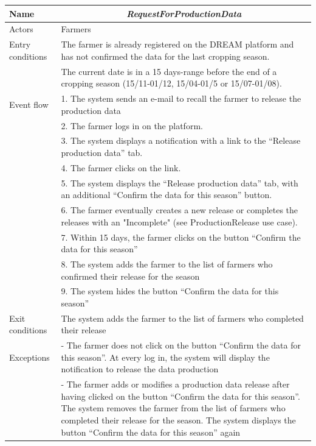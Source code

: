 \begin{table}[H]
	\centering
	\begin{tabularx}{\linewidth}{|l|X|}
		\hline
		Name & \multicolumn{1}{c|}{\textit{\textbf{RequestForProductionData}}}                                                   \tabularnewline \hline
		Actors                                               & Farmers                                                    \tabularnewline \hline
		Entry conditions                                        
		& The farmer is already registered on the DREAM platform and has not confirmed the data for the last cropping season.
		\tabularnewline
		&
		The current date is in a 15 days-range before the end of a cropping season (15/11-01/12, 15/04-01/5 or 15/07-01/08).
		\tabularnewline \hline
		Event flow                                         & 1.	The system sends an e-mail to recall the farmer to release the production data                                           \tabularnewline 
		& 2.	The farmer logs in on the platform.                                             \tabularnewline 
		& 3.	The system displays a notification with a link to the “Release production data” tab.                                           \tabularnewline 
		& 4.	The farmer clicks on the link.                                    \tabularnewline
		& 5.	The system displays the “Release production data” tab, with an additional “Confirm the data for this season” button.                                           \tabularnewline
		& 6.	The farmer eventually creates a new release or completes the releases with an "Incomplete" (see ProductionRelease use case).                                     \tabularnewline
		& 7.	Within 15 days, the farmer clicks on the button “Confirm the data for this season”                                \tabularnewline
		& 8.	The system adds the farmer to the list of farmers who confirmed their release for the season                              \tabularnewline
		& 9.	The system hides the button “Confirm the data for this season”                       \tabularnewline \hline
		Exit conditions 
		& The system adds the farmer to the list of farmers who completed their release 
		\tabularnewline \hline
		Exceptions 
		& 
		-	The farmer does not click on the button “Confirm the data for this season”. At every log in, the system will display the notification to release the data production
		\tabularnewline
		&
		-	The farmer adds or modifies a production data release after having clicked on the button “Confirm the data for this season”. The system removes the farmer from the list of farmers who completed their release for the season. The system displays the button “Confirm the data for this season” again
		\tabularnewline
		\hline
	\end{tabularx}   
\end{table}

